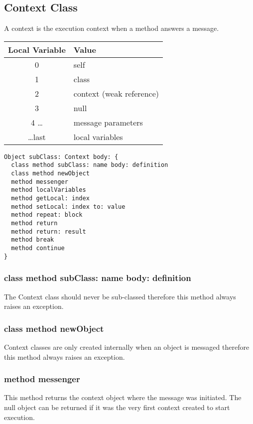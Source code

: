 \subsection {Context Class}

A context is the execution context when a method answers a message.
\begin{center}
  \begin{tabular}{ c | l }
    Local Variable & Value\\ \hline
    0 & self \\
    1 & class \\
    2 & context (weak reference) \\
    3 & null \\
    4 \dots & message parameters \\
    \dots last & local variables \\
  \end{tabular}
\end{center}

\begin{lstlisting}
Object subClass: Context body: {
  class method subClass: name body: definition
  class method newObject
  method messenger
  method localVariables
  method getLocal: index
  method setLocal: index to: value
  method repeat: block
  method return
  method return: result
  method break
  method continue
}
\end{lstlisting}

\subsubsection {class method subClass: name body: definition}
The Context class should never be sub-classed therefore this method always
raises an exception.

\subsubsection {class method newObject}
Context classes are only created internally when an object is messaged
therefore this method always raises an exception.

\subsubsection {method messenger}
This method returns the context object where the message was
initiated. The null object can be returned if it was the very first context
created to start execution.

